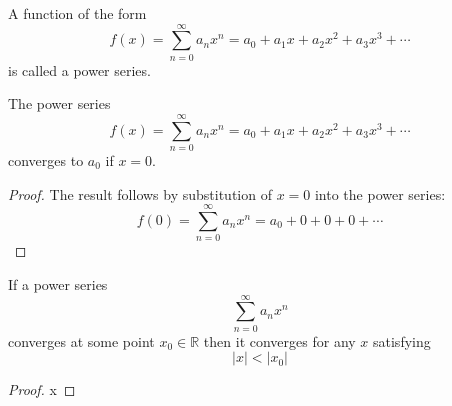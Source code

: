 \begin{definition} A function of the form
\[
f(x) = \sum_{n=0}^\infty a_nx^n = a_0+a_1x+a_2x^2+a_3x^3+\cdots
\]
is called a power series.
\end{definition}
\begin{theorem}
The power series
\[
f(x) = \sum_{n=0}^\infty a_nx^n = a_0+a_1x+a_2x^2+a_3x^3+\cdots
\]
converges to $a_0$ if $x=0$.
\end{theorem}
\begin{proof}
The result follows by substitution of $x=0$ into the power series:
\[
f(0) = \sum_{n=0}^\infty a_nx^n = a_0+0+0+0+\cdots
\]
\end{proof}
\begin{theorem}
If a power series
\[
\sum_{n=0}^\infty a_nx^n
\]
converges at some point $x_0\in\mathbb{R}$ then it converges for any $x$ satisfying
\[
|x| < |x_0|
\]
\end{theorem}
\begin{proof}
x
\end{proof}
